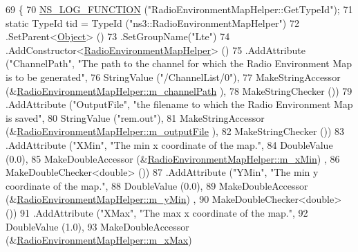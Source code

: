 \begin{DoxyCode}
69 \{
70   \hyperlink{log-macros-disabled_8h_a90b90d5bad1f39cb1b64923ea94c0761}{NS\_LOG\_FUNCTION} (\textcolor{stringliteral}{"RadioEnvironmentMapHelper::GetTypeId"});
71   \textcolor{keyword}{static} TypeId tid = TypeId (\textcolor{stringliteral}{"ns3::RadioEnvironmentMapHelper"})
72     .SetParent<\hyperlink{classns3_1_1Object_a40860402e64d8008fb42329df7097cdb}{Object}> ()
73     .SetGroupName(\textcolor{stringliteral}{"Lte"})
74     .AddConstructor<\hyperlink{classns3_1_1RadioEnvironmentMapHelper_a8300799eb72fdffdb86a4d46ec58fbbf}{RadioEnvironmentMapHelper}> ()
75     .AddAttribute (\textcolor{stringliteral}{"ChannelPath"}, \textcolor{stringliteral}{"The path to the channel for which the Radio Environment Map is to be
       generated"},
76                    StringValue (\textcolor{stringliteral}{"/ChannelList/0"}),
77                    MakeStringAccessor (&\hyperlink{classns3_1_1RadioEnvironmentMapHelper_ad059b7a091d9438c3c7539f122cd3070}{RadioEnvironmentMapHelper::m\_channelPath}
      ),
78                    MakeStringChecker ())
79     .AddAttribute (\textcolor{stringliteral}{"OutputFile"}, \textcolor{stringliteral}{"the filename to which the Radio Environment Map is saved"},
80                    StringValue (\textcolor{stringliteral}{"rem.out"}),
81                    MakeStringAccessor (&\hyperlink{classns3_1_1RadioEnvironmentMapHelper_a4ed6a97a3aa3011388fdc771af50ae66}{RadioEnvironmentMapHelper::m\_outputFile}
      ),
82                    MakeStringChecker ())
83     .AddAttribute (\textcolor{stringliteral}{"XMin"}, \textcolor{stringliteral}{"The min x coordinate of the map."},
84                    DoubleValue (0.0),
85                    MakeDoubleAccessor (&\hyperlink{classns3_1_1RadioEnvironmentMapHelper_ad164d05e2fb8ffebea24ea33d0fc384b}{RadioEnvironmentMapHelper::m\_xMin})
      ,
86                    MakeDoubleChecker<double> ())
87     .AddAttribute (\textcolor{stringliteral}{"YMin"}, \textcolor{stringliteral}{"The min y coordinate of the map."},
88                    DoubleValue (0.0),
89                    MakeDoubleAccessor (&\hyperlink{classns3_1_1RadioEnvironmentMapHelper_a86310d0183abfba8d6ea5e98eeb7d166}{RadioEnvironmentMapHelper::m\_yMin})
      ,
90                    MakeDoubleChecker<double> ())
91    .AddAttribute (\textcolor{stringliteral}{"XMax"}, \textcolor{stringliteral}{"The max x coordinate of the map."},
92                    DoubleValue (1.0),
93                    MakeDoubleAccessor (&\hyperlink{classns3_1_1RadioEnvironmentMapHelper_aa5f098561e72eacb242a5ecbb65a882f}{RadioEnvironmentMapHelper::m\_xMax})

\end{DoxyCode}
